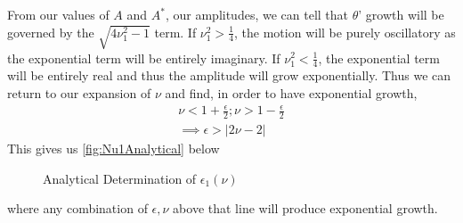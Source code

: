 \documentclass[12pt]{article}
\begin{document}
\begin{enumerate}
\begin{enumerate}
            From our values of $A$ and $A^*$, our amplitudes, we can tell that $\theta$' growth will be governed 
            by the $\sqrt{4\nu_1^2-1}$ term. If $\nu_1^2>\frac{1}{4}$, the motion will be purely oscillatory 
            as the exponential term will be entirely imaginary. If $\nu_1^2<\frac{1}{4}$, the exponential 
            term will be entirely real and thus the amplitude will grow exponentially. Thus we can return to 
            our expansion of $\nu$ and find, in order to have exponential growth,
            \begin{equation*}
                \begin{gathered}
                    \nu < 1+\frac{\epsilon}{2}; \nu > 1-\frac{\epsilon}{2} \\
                    \implies \epsilon > |2\nu -2|
                \end{gathered}
            \end{equation*}
            This gives us \autoref{fig:Nu1Analytical} below
            \begin{figure}[H]
                \begin{center}
                   \scalebox{.7}{}
                   \caption{Analytical Determination of $\epsilon_1(\nu)$}
                   \label{fig:Nu1Analytical}
                \end{center}
            \end{figure}
            \noindent
            where any combination of $\epsilon, \nu$ above that line will produce exponential 
            growth.


\end{enumerate}
\end{enumerate}
\end{document}
